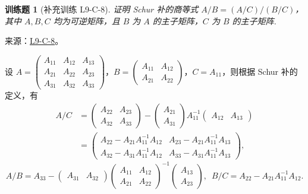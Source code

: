 \documentclass[12pt,fontset=fandol]{ctexart}
\newtheorem{exercise}{训练题}[section]
\begin{document}
\begin{exercise}[补充训练 L9-C-8]\label{prob:L9-C-8}
证明 Schur 补的商等式 $A/B=(A/C)/(B/C)$，其中 $A,B,C$ 均为可逆矩阵，且 $B$ 为 $A$ 的主子矩阵，$C$ 为 $B$ 的主子矩阵.
\end{exercise}
\noindent 来源：\href{https://github.com/yhwu-is/Linear-Algebra-Left-Undone/blob/new/%E8%AE%B2%E4%B9%89/%E4%B8%93%E9%A2%98/9%20%E7%9F%A9%E9%98%B5%E8%BF%90%E7%AE%97%E8%BF%9B%E9%98%B6.tex}{L9-C-8}。
\begin{solve}
设 $A = \begin{pmatrix}
                    A_{11} & A_{12} & A_{13} \\
                    A_{21} & A_{22} & A_{23} \\
                    A_{31} & A_{32} & A_{33}
                \end{pmatrix}$，$B = \begin{pmatrix}
                    A_{11} & A_{12} \\
                    A_{21} & A_{22}
                \end{pmatrix}$，$C = A_{11}$，则根据 Schur 补的定义，有
                \begin{align*}
                    A/C &= \begin{pmatrix}
                        A_{22} & A_{23} \\
                        A_{32} & A_{33}
                    \end{pmatrix} - \begin{pmatrix}
                        A_{21} \\ A_{31}
                    \end{pmatrix} A_{11}^{-1} \begin{pmatrix}
                        A_{12} & A_{13}
                    \end{pmatrix} \\
                    &= \begin{pmatrix}
                        A_{22} - A_{21} A_{11}^{-1} A_{12} & A_{23} - A_{21} A_{11}^{-1} A_{13} \\
                        A_{32} - A_{31} A_{11}^{-1} A_{12} & A_{33} - A_{31} A_{11}^{-1} A_{13}
                    \end{pmatrix},
                \end{align*}
                \[
                    A/B = A_{33} - \begin{pmatrix}
                        A_{31} & A_{32}
                    \end{pmatrix} \begin{pmatrix}
                        A_{11} & A_{12} \\
                        A_{21} & A_{22}
                    \end{pmatrix}^{-1} \begin{pmatrix}
                        A_{13} \\ A_{23}
                    \end{pmatrix}, \enspace
                    B/C = A_{22} - A_{21} A_{11}^{-1} A_{12}.
                \]


\end{solve}
\end{document}
